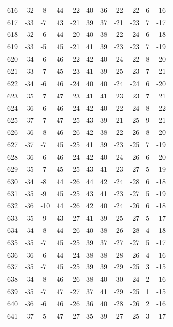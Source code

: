 \begin{table}[H]
\begin{tabular}{lllllllllll}
616 & -32 & -8 & 44 & -22 & 40 & 36 & -22 & -22 & 6 & -16 \\
617 & -33 & -7 & 43 & -21 & 39 & 37 & -21 & -23 & 7 & -17 \\
618 & -32 & -6 & 44 & -20 & 40 & 38 & -22 & -24 & 6 & -18 \\
619 & -33 & -5 & 45 & -21 & 41 & 39 & -23 & -23 & 7 & -19 \\
620 & -34 & -6 & 46 & -22 & 42 & 40 & -24 & -22 & 8 & -20 \\
621 & -33 & -7 & 45 & -23 & 41 & 39 & -25 & -23 & 7 & -21 \\
622 & -34 & -6 & 46 & -24 & 40 & 40 & -24 & -24 & 6 & -20 \\
623 & -35 & -7 & 47 & -23 & 41 & 41 & -23 & -23 & 7 & -21 \\
624 & -36 & -6 & 46 & -24 & 42 & 40 & -22 & -24 & 8 & -22 \\
625 & -37 & -7 & 47 & -25 & 43 & 39 & -21 & -25 & 9 & -21 \\
626 & -36 & -8 & 46 & -26 & 42 & 38 & -22 & -26 & 8 & -20 \\
627 & -37 & -7 & 45 & -25 & 41 & 39 & -23 & -25 & 7 & -19 \\
628 & -36 & -6 & 46 & -24 & 42 & 40 & -24 & -26 & 6 & -20 \\
629 & -35 & -7 & 45 & -25 & 43 & 41 & -23 & -27 & 5 & -19 \\
630 & -34 & -8 & 44 & -26 & 44 & 42 & -24 & -28 & 6 & -18 \\
631 & -35 & -9 & 45 & -25 & 43 & 41 & -23 & -27 & 5 & -19 \\
632 & -36 & -10 & 44 & -26 & 42 & 40 & -24 & -26 & 6 & -18 \\
633 & -35 & -9 & 43 & -27 & 41 & 39 & -25 & -27 & 5 & -17 \\
634 & -34 & -8 & 44 & -26 & 40 & 38 & -26 & -28 & 4 & -18 \\
635 & -35 & -7 & 45 & -25 & 39 & 37 & -27 & -27 & 5 & -17 \\
636 & -36 & -6 & 44 & -24 & 38 & 38 & -28 & -26 & 4 & -16 \\
637 & -35 & -7 & 45 & -25 & 39 & 39 & -29 & -25 & 3 & -15 \\
638 & -34 & -8 & 46 & -26 & 38 & 40 & -30 & -24 & 2 & -16 \\
639 & -35 & -7 & 47 & -27 & 37 & 41 & -29 & -25 & 1 & -15 \\
640 & -36 & -6 & 46 & -26 & 36 & 40 & -28 & -26 & 2 & -16 \\
641 & -37 & -5 & 47 & -27 & 35 & 39 & -27 & -25 & 3 & -17 \\

\end{tabular}
\end{table}
